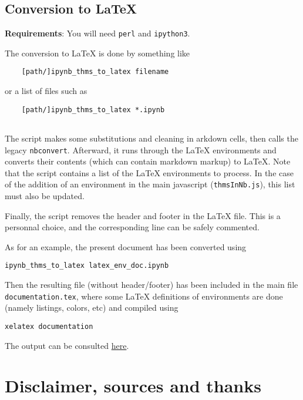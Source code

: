     \subsection{Conversion to LaTeX}\label{conversion-to-latex}

    \textbf{Requirements}: You will need \texttt{perl} and
\texttt{ipython3}.

The conversion to LaTeX is done by something like

\begin{verbatim}
    [path/]ipynb_thms_to_latex filename
\end{verbatim}

or a list of files such as

\begin{verbatim}
    [path/]ipynb_thms_to_latex *.ipynb
    
\end{verbatim}

The script makes some substitutions and cleaning in arkdown cells, then
calls the legacy \texttt{nbconvert}. Afterward, it runs through the
LaTeX environments and converts their contents (which can contain
markdown markup) to LaTeX. Note that the script contains a list of the
LaTeX environments to process. In the case of the addition of an
environment in the main javascript (\texttt{thmsInNb.js}), this list
must also be updated.

Finally, the script removes the header and footer in the LaTeX file.
This is a personnal choice, and the corresponding line can be safely
commented.

\begin{example}
As for an example, the present document has been converted using

\begin{verbatim}
ipynb_thms_to_latex latex_env_doc.ipynb
\end{verbatim}

Then the resulting file (without header/footer) has been included in the
main file \texttt{documentation.tex}, where some LaTeX definitions of
environments are done (namely listings, colors, etc) and compiled using

\begin{verbatim}
xelatex documentation
\end{verbatim}

The output can be consulted \href{documentation.pdf}{here}.
\end{example}

    \section{Disclaimer, sources and
thanks}\label{disclaimer-sources-and-thanks}

